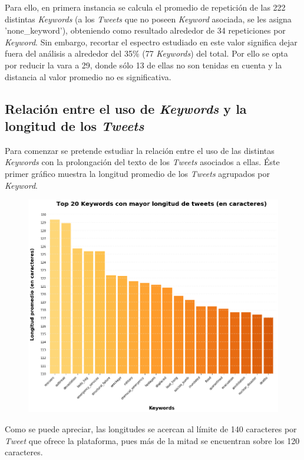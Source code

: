 \documentclass[titlepage,a4paper]{article}
\begin{document}
    Para ello, en primera instancia se calcula el promedio de repetición de las 222 distintas \textit{Keywords} (a los \textit{Tweets} que no poseen \textit{Keyword} asociada, se les asigna 'none\_keyword'), obteniendo como resultado alrededor de 34 repeticiones por \textit{Keyword}. Sin embargo, recortar el espectro estudiado en este valor significa dejar fuera del análisis a alrededor del 35\% (77 \textit{Keywords}) del total. Por ello se opta por reducir la vara a 29, donde sólo 13 de ellas no son tenidas en cuenta y la distancia al valor promedio no es significativa. 
    
     \subsection{Relación entre el uso de \textit{Keywords} y la longitud de los \textit{Tweets}}
    
    Para comenzar se pretende estudiar la relación entre el uso de las distintas \textit{Keywords} con la prolongación del texto de los \textit{Tweets} asociados a ellas. Éste primer gráfico muestra la longitud promedio de los \textit{Tweets} agrupados por \textit{Keyword}. 

    \begin{figure}[H]
    \centering
    \includegraphics[width=1\textwidth]{graficos/Analisis de Keyword/top_20_long_con_mayor_long_de_tweets.png}
    \caption{} 
    \end{figure}
    
    Como se puede apreciar, las longitudes se acercan al límite de 140 caracteres por \textit{Tweet} que ofrece la plataforma, pues más de la mitad se encuentran sobre los 120 caracteres. 
    
\end{document}
